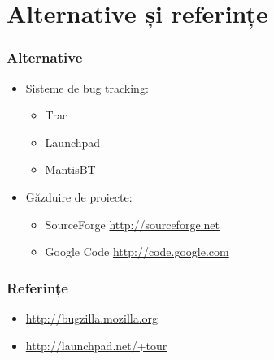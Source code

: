 \documentclass{beamer}
\begin{document}
\section {Alternative și referințe}
\frame{\tableofcontents[currentsection]}

\begin{frame}
\frametitle{Alternative}
\begin{itemize}
\item Sisteme de bug tracking:
\begin{itemize}
\item Trac
\item Launchpad
\item MantisBT
\end{itemize}
\item Găzduire de proiecte:
\begin{itemize}
\item SourceForge \url{http://sourceforge.net}
\item Google Code \url{http://code.google.com}
\end{itemize}
\end{itemize}
\end{frame}

\begin{frame}
\frametitle{Referințe}
\begin{itemize}
\item \url{http://bugzilla.mozilla.org}
\item \url{http://launchpad.net/+tour}
\end{itemize}
\end{frame}
\end{document}
